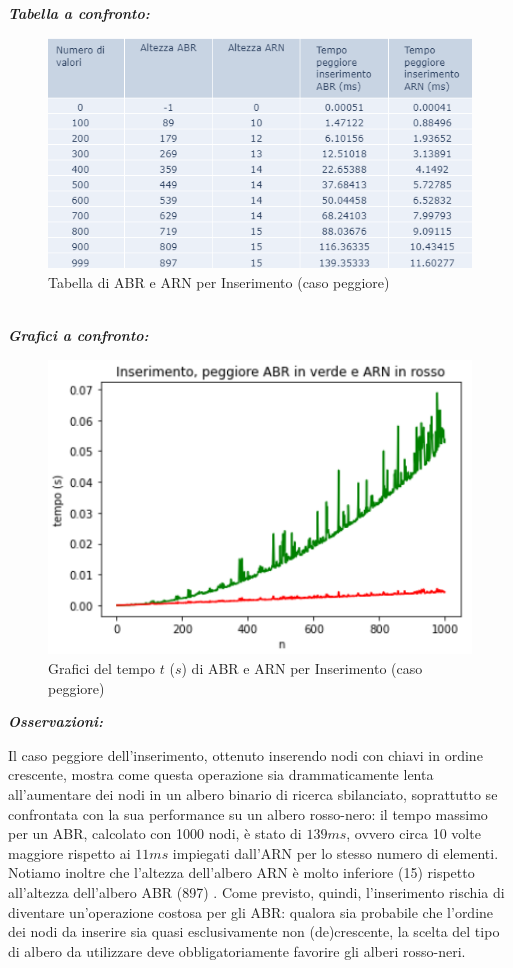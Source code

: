 \documentclass[]{article}
\begin{document}
\noindent \textit{\bf{Tabella a confronto:}}
\begin{figure}[ht]
\centering
\includegraphics[]{TabellaPeggioreInserimento}
\caption{Tabella di ABR e ARN per Inserimento (caso peggiore)}
\label{fig:fig1}
\end{figure}
\\
\noindent \textit{\bf{Grafici a confronto:}} 
\begin{figure}[ht]
\centering
\includegraphics[width=.7\textwidth, height=.6\textheight, keepaspectratio]{GraficoInserimentoPeggiore}
\vspace{-5mm}
\caption{Grafici del tempo $t$ ($s$) di ABR e ARN per Inserimento (caso peggiore)}
\label{fig:fig2}
\end{figure}

\noindent \textit{\bf{Osservazioni:}} 

Il caso peggiore dell'inserimento, ottenuto inserendo nodi con chiavi in ordine crescente, mostra come questa operazione sia drammaticamente lenta all'aumentare dei nodi in un albero binario di ricerca sbilanciato, soprattutto se confrontata con la sua performance su un albero rosso-nero: il tempo massimo per un ABR, calcolato con 1000 nodi, è stato di $139 ms$, ovvero circa 10 volte maggiore rispetto ai $11 ms$ impiegati dall'ARN per lo stesso numero di elementi. \\
Notiamo inoltre che l'altezza dell'albero ARN è molto inferiore (15) rispetto all'altezza dell'albero ABR (897) . Come previsto, quindi, l'inserimento rischia di diventare un'operazione costosa per gli ABR: qualora sia probabile che l'ordine dei nodi da inserire sia quasi esclusivamente non (de)crescente, la scelta del tipo di albero da utilizzare deve obbligatoriamente favorire gli alberi rosso-neri. \\
\end{document}
